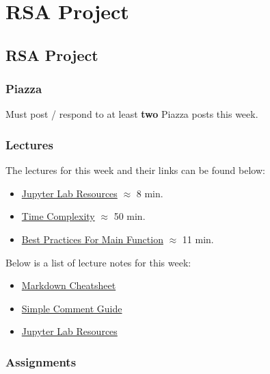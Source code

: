 \clearpage

\renewcommand{\ChapTitle}{RSA Project}
\renewcommand{\SectionTitle}{RSA Project}

\chapter{\ChapTitle}
\section{\SectionTitle}

\subsection{Piazza}

Must post / respond to at least \textbf{two} Piazza posts this week.

\subsection{Lectures}

The lectures for this week and their links can be found below:

\begin{itemize}
    \item \href{https://applied.cs.colorado.edu/mod/hvp/view.php?id=51743}{Jupyter Lab Resources} $\approx$ 8 min.
    \item \href{https://applied.cs.colorado.edu/mod/hvp/view.php?id=51746}{Time Complexity} $\approx$ 50 min.
    \item \href{https://www.youtube.com/watch?v=lOeIDvyRUQs}{Best Practices For Main Function} $\approx$ 11 min.
\end{itemize}

\noindent Below is a list of lecture notes for this week:

\begin{itemize}
    \item \href{https://github.com/adam-p/markdown-here/wiki/Markdown-Cheatsheet}{Markdown Cheatsheet}
    \item \href{https://realpython.com/python-comments-guide/}{Simple Comment Guide}
    \item \href{https://www.colorado.edu/cs/students/computing-resources-students}{Jupyter Lab Resources}
\end{itemize}

\subsection{Assignments}

